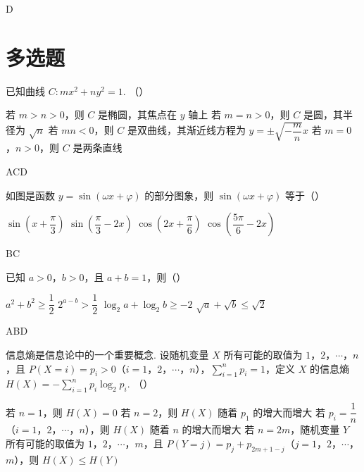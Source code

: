 \begin{answer}
D
\end{answer}

\section{多选题}

\begin{problem}
已知曲线 \(C:mx^2+ny^2=1\). （\quad）

\choices
    {若 \(m>n>0\)，则 \(C\) 是椭圆，其焦点在 \(y\) 轴上}
    {若 \(m=n>0\)，则 \(C\) 是圆，其半径为 \(\sqrt{n}\)}
    {若 \(mn<0\)，则 \(C\) 是双曲线，其渐近线方程为 \(y=\pm\sqrt{-\dfrac{m}{n}}x\)}
    {若 \(m=0\)，\(n>0\)，则 \(C\) 是两条直线}
\end{problem}

\begin{answer}
ACD
\end{answer}

\begin{problem}
如图是函数 \(y=\sin(\omega x+\varphi)\) 的部分图象，则 \(\sin(\omega x+\varphi)\) 等于（\quad）

\begin{center}
\end{center}

\choices
    {\(\sin\left( x+\dfrac{\pi}{3} \right)\)}
    {\(\sin\left( \dfrac{\pi}{3}-2x \right)\)}
    {\(\cos\left( 2x+\dfrac{\pi}{6} \right)\)}
    {\(\cos\left( \dfrac{5\pi}{6}-2x \right)\)}
\end{problem}

\begin{answer}
BC
\end{answer}

\begin{problem}
已知 \(a>0\)，\(b>0\)，且 \(a+b=1\)，则（\quad）

\choices
    {\(a^2+b^2\ge\dfrac{1}{2}\)}
    {\(2^{a-b}>\dfrac{1}{2}\)}
    {\(\log_2 a+\log_2 b\ge -2\)}
    {\(\sqrt{a}+\sqrt{b}\le\sqrt{2}\)}
\end{problem}

\begin{answer}
ABD
\end{answer}

\begin{problem}
信息熵是信息论中的一个重要概念. 设随机变量 \(X\) 所有可能的取值为 \(1\)，\(2\)，\(\cdots\)，\(n\)，且 \(P(X=i)=p_i>0\)（\(i=1\)，\(2\)，\(\cdots\)，\(n\)），\(\sum_{i=1}^{n}p_i=1\)，定义 \(X\) 的信息熵 \(H(X)=-\sum_{i=1}^{n}p_i\log_2 p_i\). （\quad）

\choices
    {若 \(n=1\)，则 \(H(X)=0\)}
    {若 \(n=2\)，则 \(H(X)\) 随着 \(p_1\) 的增大而增大}
    {若 \(p_i=\dfrac{1}{n}\)（\(i=1\)，\(2\)，\(\cdots\)，\(n\)），则 \(H(X)\) 随着 \(n\) 的增大而增大}
    {若 \(n=2m\)，随机变量 \(Y\) 所有可能的取值为 \(1\)，\(2\)，\(\cdots\)，\(m\)，且 \(P(Y=j)=p_j+p_{2m+1-j}\)（\(j=1\)，\(2\)，\(\cdots\)，\(m\)），则 \(H(X)\le H(Y)\)}
\end{problem}

